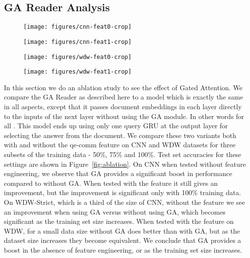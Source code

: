 \documentclass[11pt,a4paper]{article}
\begin{document}
\subsection{GA Reader Analysis}
\label{sec:ablation}
\begin{figure*}[ht]
    \centering
    \caption{Performance in accuracy with and without the Gated-Attention module over different training sizes. -values for an exact one-sided Mcnemar's test are given inside the parentheses for each setting.}
    \begin{subfigure}[b]{0.245\textwidth}
    \texttt{[image: figures/cnn-feat0-crop]}
        \label{fig:cnn_wo_f}
    \end{subfigure}
    \begin{subfigure}[b]{0.245\textwidth}
        \texttt{[image: figures/cnn-feat1-crop]}
        \label{fig:cnn_w_f}
    \end{subfigure}
        \begin{subfigure}[b]{0.245\textwidth}
    \texttt{[image: figures/wdw-feat0-crop]}
        \label{fig:wdw_wo_f}
    \end{subfigure}
    \begin{subfigure}[b]{0.245\textwidth}
        \texttt{[image: figures/wdw-feat1-crop]}
        \label{fig:wdw_w_f}
    \end{subfigure}
    \label{fig:ablation}
\end{figure*}

In this section we do an ablation study to see the effect of Gated Attention. We compare the GA Reader as described here to a model which is exactly the same in all aspects, except that it passes document embeddings  in each layer directly to the inputs of the next layer without using the GA module. In other words  for all . This model ends up using only one query GRU at the output layer for selecting the answer from the document. We compare these two variants both with and without the qe-comm feature on CNN and WDW datasets for three subsets of the training data - 50\%, 75\% and 100\%. Test set accuracies for these settings are shown in Figure~\ref{fig:ablation}. On CNN when tested without feature engineering, we observe that GA provides a significant boost in performance compared to without GA. When tested with the feature it still gives an improvement, but the improvement is significant only with 100\% training data. On WDW-Strict, which is a third of the size of CNN, without the feature we see an improvement when using GA versus without using GA, which becomes significant as the training set size increases. When tested with the feature on WDW, for a small data size without GA does better than with GA, but as the dataset size increases they become equivalent. We conclude that GA provides a boost in the absence of feature engineering, or as the training set size increases.
\end{document}

